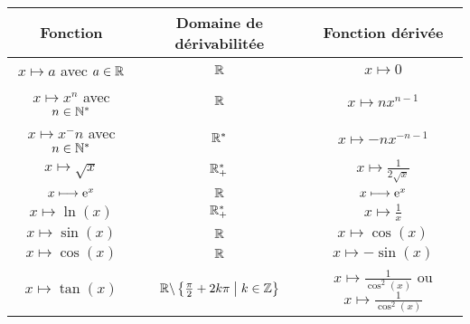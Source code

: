 \begin{defprop}
    ~\\
	\begin{tabular}{|c|c|c|}

		\hline
		\textbf{Fonction}                    & \textbf{Domaine de dérivabilitée}                 & \textbf{Fonction dérivée}                                             \\
		\hline
		\(x\mapsto a\) avec \(a \in \mathbb{R}\)     & \(\mathbb{R}\)                                            & \(x\mapsto 0\)                                                        \\
		\hline
		\(x\mapsto x^n\) avec \(n \in \mathbb{N}^*\)  & \(\mathbb{R}\)                                            & \(x\mapsto nx^{n-1}\)                                                 \\
		\hline
		\(x\mapsto x^-n\) avec \(n \in \mathbb{N}^*\) & \(\mathbb{R}^*\)                                           & \(x\mapsto -nx^{-n-1}\)                                               \\
		\hline
		\(x\mapsto \sqrt{x}\)                & \(\mathbb{R}_+^*\)                                          & \(x\mapsto \frac{1}{2\sqrt{x}}\)                                      \\
		\hline
		\(x\longmapsto \mathrm{e}^{x}\)                   & \(\mathbb{R}\)                                            & \(x\longmapsto \mathrm{e}^{x}\)                                                    \\
		\hline
		\(x\mapsto \ln(x)\)                  & \(\mathbb{R}_+^*\)                                          & \(x\mapsto \frac{1}{x}\)                                              \\
		\hline
		\(x\mapsto \sin(x)\)                 & \(\mathbb{R}\)                                            & \(x\mapsto \cos(x)\)                                                  \\
		\hline
		\(x\mapsto \cos(x)\)                 & \(\mathbb{R}\)                                            & \(x\mapsto -\sin(x)\)                                                 \\
		\hline
		\(x\mapsto \tan(x)\)                 & \(\mathbb{R}\backslash\left\lbrace\frac{\pi}{2}+2k\pi \;\middle|\; k \in \mathbb{Z}\right\rbrace\) & \(x\mapsto \frac{1}{\cos^2(x)} \) ou \(x\mapsto \frac{1}{\cos^2(x)}\) \\
		\hline
	\end{tabular}



\end{defprop}

